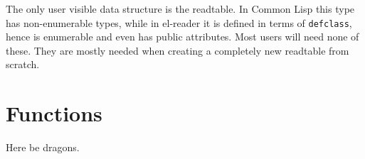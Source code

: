 \documentclass[a4paper,10pt,twoside]{report}
\newcommand{\cl}{Common Lisp}
\newcommand{\elr}{el-reader}
\newcommand{\fun}[1]{\texttt{#1}}
\begin{document}
The only user visible data structure is the readtable.  In \cl{} this type has
non-enumerable types, while in \elr{} it is defined in terms of
\fun{defclass}, hence is enumerable and even has public attributes.  Most users
will need none of these.  They are mostly needed when creating a completely new
readtable from scratch.

\section{Functions}
\label{subsec:functions}

Here be dragons.

\vfill
\pagebreak


\end{document}
